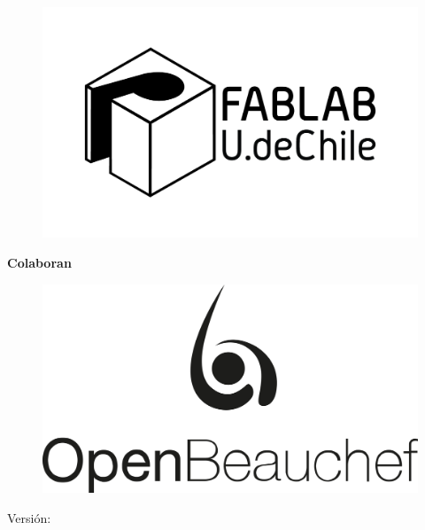 \begin{titlepage}
\begin{figure}[h!]
\begin{minipage}{.24\textwidth}
      \includegraphics[width=\linewidth]{./images/logos/fablab.jpg}
    \end{minipage}
  \end{figure}

  {\large\bfseries Colaboran}

  \begin{figure}[h!]
    \centering
    \begin{minipage}{.2\textwidth}
      \centering
      \includegraphics[width=\linewidth]{./images/logos/ob.png}
    \end{minipage}
  \end{figure}

  
  \vfill\vfill\vfill %
  
  
  {\large Versión: \the\year} %
  
  
   
  
  \vfill %
  
\end{titlepage}

